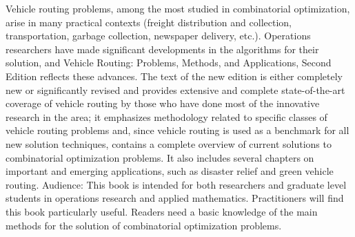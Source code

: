 Vehicle routing problems, among the most studied in combinatorial optimization, arise in many practical contexts (freight distribution and collection, transportation, garbage collection, newspaper delivery, etc.). Operations researchers have made significant developments in the algorithms for their solution, and Vehicle Routing: Problems, Methods, and Applications, Second Edition reflects these advances. The text of the new edition is either completely new or significantly revised and provides extensive and complete state-of-the-art coverage of vehicle routing by those who have done most of the innovative research in the area; it emphasizes methodology related to specific classes of vehicle routing problems and, since vehicle routing is used as a benchmark for all new solution techniques, contains a complete overview of current solutions to combinatorial optimization problems. It also includes several chapters on important and emerging applications, such as disaster relief and green vehicle routing. Audience: This book is intended for both researchers and graduate level students in operations research and applied mathematics. Practitioners will find this book particularly useful. Readers need a basic knowledge of the main methods for the solution of combinatorial optimization problems.